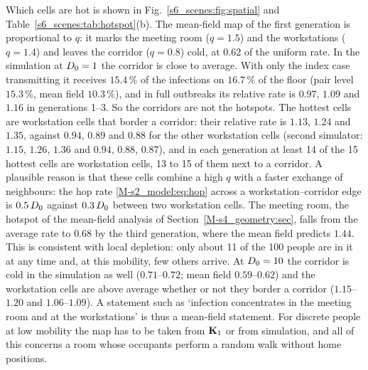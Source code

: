 Which cells are hot is shown in Fig.~\ref{s6_scenes:fig:spatial} and Table~\ref{s6_scenes:tab:hotspot}(b). The
mean-field map of the first generation is proportional to $q$: it marks the meeting room ($q=1.5$) and the
workstations ($q=1.4$) and leaves the corridor ($q=0.8$) cold, at $0.62$ of the uniform rate. In the simulation
at $D_0=1$ the corridor is close to average. With only the index case transmitting it receives $15.4\,\%$ of the
infections on $16.7\,\%$ of the floor (pair level $15.3\,\%$, mean field $10.3\,\%$), and in full outbreaks its
relative rate is $0.97$, $1.09$ and $1.16$ in generations 1--3.
So the corridors are not the hotspots. The hottest cells are workstation cells that border a corridor: their
relative rate is $1.13$, $1.24$ and $1.35$, against $0.94$, $0.89$ and $0.88$ for the other workstation cells
(second simulator: $1.15$, $1.26$, $1.36$ and $0.94$, $0.88$, $0.87$), and in each generation at least 14 of
the 15 hottest cells are workstation cells, 13 to 15 of them next to a corridor.
A plausible reason is that these cells combine a high $q$ with a faster exchange of neighbours: the hop rate
\eqref{M-s2_model:eq:hop} across a workstation--corridor edge is $0.5\,D_0$ against $0.3\,D_0$ between two
workstation cells. The meeting room, the hotspot of the mean-field analysis of Section~\ref{M-s4_geometry:sec},
falls from the average rate to $0.68$ by the third generation, where the mean field predicts $1.44$. This is
consistent with local depletion: only about 11 of the 100 people are in it at any time and, at this mobility,
few others arrive.
At $D_0=10$ the corridor is cold in the simulation as well ($0.71$--$0.72$; mean field $0.59$--$0.62$) and the
workstation cells are above average whether or not they border a corridor ($1.15$--$1.20$ and $1.06$--$1.09$).
A statement such as `infection concentrates in the meeting room and at the workstations' is thus a mean-field
statement. For discrete people at low mobility the map has to be taken from $\mathbf{K}_1$ or from simulation, and
all of this concerns a room whose occupants perform a random walk without home positions.

